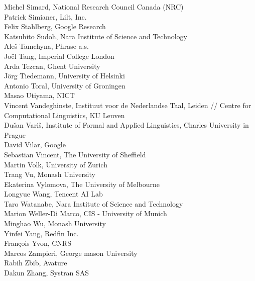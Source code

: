 \documentclass[a4paper,11pt,twoside]{book}
\begin{document}
\noindent Michel Simard, National Research Council Canada (NRC)\\
\noindent Patrick Simianer, Lilt, Inc.\\
\noindent Felix Stahlberg, Google Research\\
\noindent Katsuhito Sudoh, Nara Institute of Science and Technology\\
\noindent Aleš Tamchyna, Phrase a.s.\\
\noindent Joël Tang, Imperial College London\\
\noindent Arda Tezcan, Ghent University\\
\noindent Jörg Tiedemann, University of Helsinki\\
\noindent Antonio Toral, University of Groningen\\
\noindent Masao Utiyama, NICT\\
\noindent Vincent Vandeghinste, Instituut voor de Nederlandse Taal, Leiden // Centre for Computational Linguistics, KU Leuven\\
\noindent Dušan Variš, Institute of Formal and Applied Linguistics, Charles University in Prague\\
\noindent David Vilar, Google\\
\noindent Sebastian Vincent, The University of Sheffield\\
\noindent Martin Volk, University of Zurich\\
\noindent Trang Vu, Monash University\\
\noindent Ekaterina Vylomova, The University of Melbourne\\
\noindent Longyue Wang, Tencent AI Lab\\
\noindent Taro Watanabe, Nara Institute of Science and Technology\\
\noindent Marion Weller-Di Marco, CIS - University of Munich\\
\noindent Minghao Wu, Monash University\\
\noindent Yinfei Yang, Redfin Inc.\\
\noindent François Yvon, CNRS\\
\noindent Marcos Zampieri, George mason University\\
\noindent Rabih Zbib, Avature\\
\noindent Dakun Zhang, Systran SAS

\pagebreak
\end{document}

